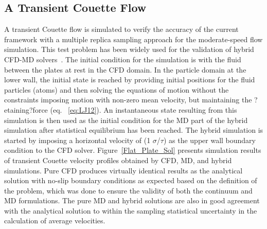 \documentclass[preprint,12pt]{elsarticle}
\begin{document}
\subsection{A Transient Couette Flow}
\label{sec:accuracy_couette}


A transient Couette flow is simulated to verify the accuracy of the current framework with a multiple replica sampling approach for the moderate-speed flow simulation. This test problem has been widely used for the validation of hybrid CFD-MD solvers~\cite{Nie,Yen}. The initial condition for the simulation is with the fluid between the plates at rest in the CFD domain. In the particle domain at the lower wall, the initial state is reached by providing initial positions for the fluid particles (atoms) and then solving the equations of motion without the constraints imposing motion with non-zero mean velocity, but maintaining the ?etaining?force (eq. ~\ref{eq:LJ12}). An instantaneous state resulting from this simulation is then used as the initial condition for the MD part of the hybrid simulation after statistical equilibrium has been reached. The hybrid simulation is started by imposing a horizontal velocity  of  (1 $\sigma$/$\tau$) as the upper wall boundary condition to the CFD solver. Figure~\ref{Flat_Plate_Sol} presents simulation results of transient Couette velocity profiles obtained by CFD, MD, and hybrid simulations. Pure CFD produces virtually identical results as the analytical solution with no-slip boundary conditions as expected based on the definition of the problem, which was done to ensure the validity of both the continuum and MD formulations. The pure MD and hybrid solutions are also in good agreement with the analytical solution to within the sampling statistical uncertainty in the calculation of average velocities.
\end{document}
